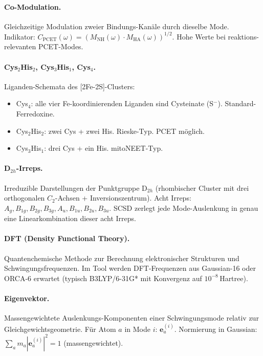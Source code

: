 \documentclass[11pt,a4paper,twoside]{article}
\theoremstyle{remark}
\begin{document}
\paragraph{Co-Modulation.}
Gleichzeitige Modulation zweier Bindungs-Kan\"ale durch dieselbe
Mode. Indikator: $C_\text{PCET}(\omega) = (M_\text{NH}(\omega)
\cdot M_\text{HA}(\omega))^{1/2}$. Hohe Werte bei reaktions-
relevanten PCET-Modes.

\paragraph{Cys$_2$His$_2$, Cys$_3$His$_1$, Cys$_4$.}
Liganden-Schemata des [2Fe-2S]-Clusters:
\begin{itemize}\setlength{\itemsep}{0pt}
  \item Cys$_4$: alle vier Fe-koordinierenden Liganden sind
        Cysteinate (S$^-$). Standard-Ferredoxine.
  \item Cys$_2$His$_2$: zwei Cys + zwei His. Rieske-Typ. PCET m\"oglich.
  \item Cys$_3$His$_1$: drei Cys + ein His. mitoNEET-Typ.
\end{itemize}

\paragraph{D$_{2h}$-Irreps.}
Irreduzible Darstellungen der Punktgruppe D$_{2h}$ (rhombischer
Cluster mit drei orthogonalen $C_2$-Achsen + Inversionszentrum).
Acht Irreps: $A_g, B_{1g}, B_{2g}, B_{3g}, A_u, B_{1u}, B_{2u},
B_{3u}$. SCSD zerlegt jede Mode-Auslenkung in genau eine
Linearkombination dieser acht Irreps.

\paragraph{DFT (Density Functional Theory).}
Quantenchemische Methode zur Berechnung elektronischer Strukturen
und Schwingungsfrequenzen. Im Tool werden DFT-Frequenzen aus
Gaussian-16 oder ORCA-6 erwartet (typisch B3LYP/6-31G* mit
Konvergenz auf $10^{-8}$\,Hartree).

\paragraph{Eigenvektor.}
Massengewichtete Auslenkungs-Komponenten einer Schwingungsmode
relativ zur Gleichgewichtsgeometrie. F\"ur Atom $a$ in Mode $i$:
$\mathbf{e}_a^{(i)}$. Normierung in Gaussian: $\sum_a m_a
|\mathbf{e}_a^{(i)}|^2 = 1$ (massengewichtet).
\end{document}
